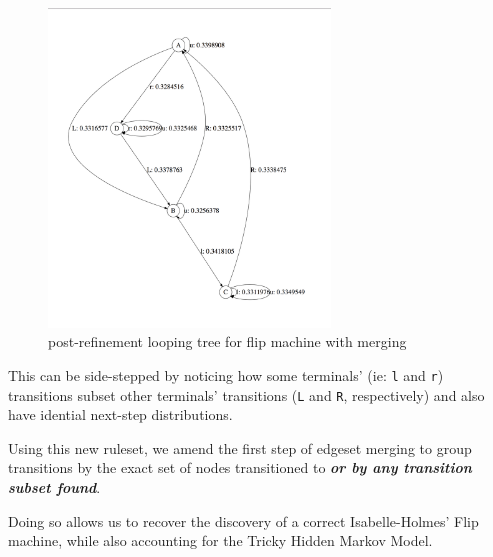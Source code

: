 \documentclass{article}
\begin{document}
\begin{figure}[h!]
\centering
\includegraphics[width=75mm]{imgs/flip-merge.png}
\caption{post-refinement looping tree for flip machine with merging}
\label{fig:method}
\end{figure}

\newpage

This can be side-stepped by noticing how some terminals' (ie: {\tt l} and {\tt r})
transitions subset other terminals' transitions ({\tt L} and {\tt R},
respectively) and also have idential next-step distributions.

Using this new ruleset, we amend the first step of edgeset merging to group
transitions by the exact set of nodes transitioned to \textit{\textbf{or by any
transition subset found}}.

Doing so allows us to recover the discovery of a correct Isabelle-Holmes'
Flip machine, while also accounting for the Tricky Hidden Markov Model.
\end{document}
